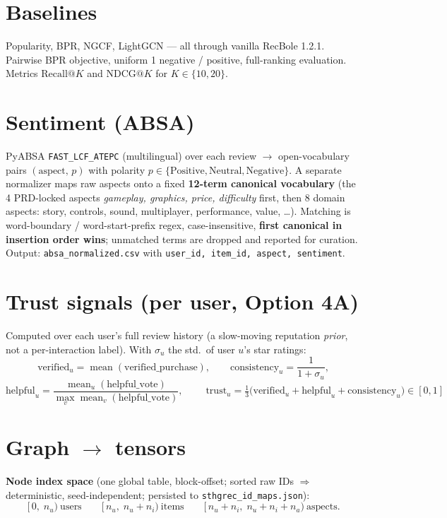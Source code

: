 \documentclass[10pt]{article}
\newcommand{\code}[1]{\texttt{\small #1}}
\begin{document}
\section{Baselines}
Popularity, BPR, NGCF, LightGCN --- all through vanilla RecBole 1.2.1. Pairwise BPR
objective, uniform 1 negative / positive, full-ranking evaluation. Metrics
$\mathrm{Recall}@K$ and $\mathrm{NDCG}@K$ for $K\in\{10,20\}$.

\section{Sentiment (ABSA)}
PyABSA \code{FAST\_LCF\_ATEPC} (multilingual) over each review $\rightarrow$ open-vocabulary
pairs $(\text{aspect},\,p)$ with polarity
$p\in\{\text{Positive},\text{Neutral},\text{Negative}\}$. A separate normalizer maps raw
aspects onto a fixed \textbf{12-term canonical vocabulary} (the 4 PRD-locked aspects
\emph{gameplay, graphics, price, difficulty} first, then 8 domain aspects: story,
controls, sound, multiplayer, performance, value, \dots). Matching is word-boundary /
word-start-prefix regex, case-insensitive, \textbf{first canonical in insertion order
wins}; unmatched terms are dropped and reported for curation. Output:
\code{absa\_normalized.csv} with \code{user\_id, item\_id, aspect, sentiment}.

\section{Trust signals (per user, Option 4A)}
Computed over each user's full review history (a slow-moving reputation \emph{prior}, not a
per-interaction label). With $\sigma_u$ the std.\ of user $u$'s star ratings:
\[
\text{verified}_u = \operatorname{mean}(\text{verified\_purchase}), \qquad
\text{consistency}_u = \frac{1}{1+\sigma_u},
\]
\[
\text{helpful}_u = \frac{\operatorname{mean}_u(\text{helpful\_vote})}{\max_v \operatorname{mean}_v(\text{helpful\_vote})}, \qquad
\boxed{\;\text{trust}_u = \tfrac{1}{3}\big(\text{verified}_u + \text{helpful}_u + \text{consistency}_u\big) \in [0,1]\;}
\]

\section{Graph $\rightarrow$ tensors}
\textbf{Node index space} (one global table, block-offset; sorted raw IDs $\Rightarrow$
deterministic, seed-independent; persisted to \code{sthgrec\_id\_maps.json}):
\[
[\,0,\;n_u)\ \text{users}\qquad
[\,n_u,\;n_u{+}n_i)\ \text{items}\qquad
[\,n_u{+}n_i,\;n_u{+}n_i{+}n_a)\ \text{aspects}.
\]
\end{document}
